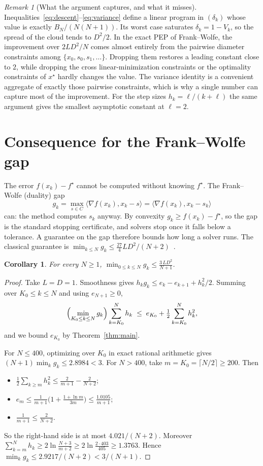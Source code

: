 \documentclass[11pt]{article}
\newtheorem{corollary}[theorem]{Corollary}
\theoremstyle{remark}
\newtheorem{remark}[theorem]{Remark}
\begin{document}
\begin{remark}[What the argument captures, and what it misses]\label{rem:captures}
Inequalities~\eqref{eq:descent}--\eqref{eq:variance} define a linear program in
$(\delta_k)$ whose value is exactly $B_N/(N(N+1))$. Its worst case saturates
$\delta_k=1-V_k$, so the spread of the cloud tends to $D^2/2$. In the exact PEP of
Frank--Wolfe, the improvement over $2LD^2/N$ comes almost entirely from the pairwise
diameter constraints among $\{x_0,s_0,s_1,\dots\}$. Dropping them restores a
leading constant close to $2$, while dropping the cross linear-minimization
constraints or the optimality constraints of $x^\star$ hardly changes the value.
The variance identity is a convenient aggregate of exactly those pairwise
constraints, which is why a single number can capture most of the improvement.
For the step sizes $h_k=\ell/(k+\ell)$ the same argument gives the smallest
asymptotic constant at $\ell=2$.
\end{remark}

\section{Consequence for the Frank--Wolfe gap}\label{sec:gap}

The error $f(x_k)-f^\star$ cannot be computed without knowing $f^\star$. The
Frank--Wolfe (duality) gap
\[
  g_k=\max_{s\in C}\langle\nabla f(x_k),x_k-s\rangle=\langle\nabla f(x_k),x_k-s_k\rangle
\]
can: the method computes $s_k$ anyway. By convexity $g_k\ge f(x_k)-f^\star$, so the
gap is the standard stopping certificate, and solvers stop once it falls below a
tolerance. A guarantee on the gap therefore bounds how long a solver runs. The
classical guarantee is
$\min_{k\le N}g_k\le\frac{27}{4}LD^2/(N+2)$~\cite[Thm.~2]{Jag13}.

\begin{corollary}\label{cor:gap}
For every $N\ge1$, $\displaystyle\min_{0\le k\le N}g_k\le\frac{3\,LD^2}{N+1}$.
\end{corollary}

\begin{proof}
Take $L=D=1$. Smoothness gives $h_kg_k\le e_k-e_{k+1}+h_k^2/2$. Summing over
$K_0\le k\le N$ and using $e_{N+1}\ge0$,
\[
  \Bigl(\min_{K_0\le k\le N}g_k\Bigr)\sum_{k=K_0}^Nh_k\;\le\;e_{K_0}+\tfrac12\sum_{k=K_0}^Nh_k^2,
\]
and we bound $e_{K_0}$ by Theorem~\ref{thm:main}.

For $N\le400$, optimizing over $K_0$ in exact rational arithmetic gives
$(N+1)\min_kg_k\le2.8984<3$. For $N>400$, take $m=K_0=\lceil N/2\rceil\ge200$. Then
\begin{itemize}
  \item $\frac12\sum_{k\ge m}h_k^2\le\frac2{m+1}-\frac2{N+2}$;
  \item $e_m\le\frac1{m+1}\bigl(1+\frac{1+\ln m}{3m}\bigr)\le\frac{1.0105}{m+1}$;
  \item $\frac1{m+1}\le\frac2{N+2}$.
\end{itemize}
So the right-hand side is at most $4.021/(N+2)$. Moreover
$\sum_{k=m}^Nh_k\ge2\ln\frac{N+3}{m+2}\ge2\ln\frac{2\cdot403}{405}\ge1.3763$. Hence
$\min_kg_k\le2.9217/(N+2)<3/(N+1)$.
\end{proof}
\end{document}
